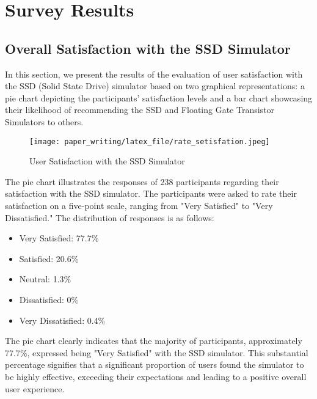 \documentclass[conference]{/home/habib/Desktop/flash_ssd_simulator_web/paper_writing/latex_file/IEEEtran}
\begin{document}
\section{Survey Results}
\subsection{Overall Satisfaction with the SSD Simulator}
In this section, we present the results of the evaluation of user satisfaction with the SSD (Solid State Drive) simulator based on two graphical representations: a pie chart depicting the participants' satisfaction levels and a bar chart showcasing their likelihood of recommending the SSD and Floating Gate Transistor Simulators to others.
\begin{figure}[h]
    \centering
    \texttt{[image: paper\_writing/latex\_file/rate\_setisfation.jpeg]}
    \caption{User Satisfaction with the SSD Simulator}
    \label{fig:enter-label}
\end{figure}
The pie chart illustrates the responses of 238 participants regarding their satisfaction with the SSD simulator. The participants were asked to rate their satisfaction on a five-point scale, ranging from "Very Satisfied" to "Very Dissatisfied." The distribution of responses is as follows:
\begin{itemize}
    \item Very Satisfied: 77.7\%
    \item Satisfied: 20.6\%
    \item Neutral: 1.3\%
    \item Dissatisfied: 0\%
    \item Very Dissatisfied: 0.4\%
\end{itemize}
The pie chart clearly indicates that the majority of participants, approximately 77.7\%, expressed being "Very Satisfied" with the SSD simulator. This substantial percentage signifies that a significant proportion of users found the simulator to be highly effective, exceeding their expectations and leading to a positive overall user experience.
\end{document}
